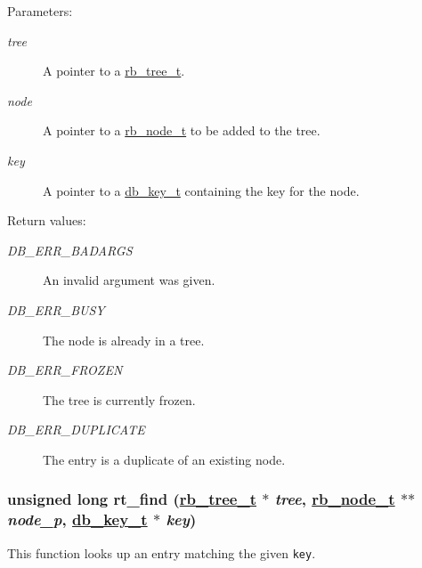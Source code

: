 \begin{Desc}
\item[Parameters:]
\begin{description}
\item[{\em tree}]A pointer to a \hyperlink{group__dbprim__rbtree_a0}{rb\_\-tree\_\-t}. \item[{\em node}]A pointer to a \hyperlink{group__dbprim__rbtree_a1}{rb\_\-node\_\-t} to be added to the tree. \item[{\em key}]A pointer to a \hyperlink{group__dbprim_a0}{db\_\-key\_\-t} containing the key for the node.\end{description}
\end{Desc}
\begin{Desc}
\item[Return values:]
\begin{description}
\item[{\em DB\_\-ERR\_\-BADARGS}]An invalid argument was given. \item[{\em DB\_\-ERR\_\-BUSY}]The node is already in a tree. \item[{\em DB\_\-ERR\_\-FROZEN}]The tree is currently frozen. \item[{\em DB\_\-ERR\_\-DUPLICATE}]The entry is a duplicate of an existing node. \end{description}
\end{Desc}
\hypertarget{group__dbprim__rbtree_a9}{
\subsubsection[rt\_\-find]{\setlength{\rightskip}{0pt plus 5cm}unsigned long rt\_\-find (\hyperlink{dbprim_8h_a0}{rb\_\-tree\_\-t} $\ast$ {\em tree}, \hyperlink{dbprim_8h_a1}{rb\_\-node\_\-t} $\ast$$\ast$ {\em node\_\-p}, \hyperlink{dbprim_8h_a0}{db\_\-key\_\-t} $\ast$ {\em key})}}
\label{group__dbprim__rbtree_a9}


This function looks up an entry matching the given {\tt key}.

